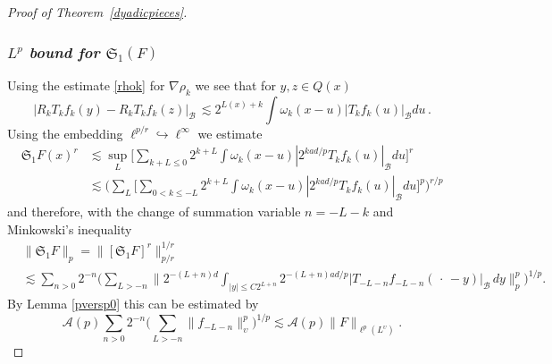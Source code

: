 \documentclass[11pt]{amsart}
\theoremstyle{definition}
\numberwithin{theorem}{section}
\numberwithin{definition}{section}
\renewcommand{\wp}{\upsilon}
\newcommand{\note}[1]{\footnote{\texttt{\Small #1}}}
\def\sB{{\mathscr{B}}}
\def\lc{\lesssim}
\def\om{\omega}              \def\Om{\Omega}
\def\fS{{\mathfrak {S}}}
\def\cA{{\mathcal {A}}}
\begin{document}
\begin{proof}[Proof of Theorem~\ref{dyadicpieces}]
\subsubsection*{{\it $L^p$ bound for $\fS_1(F)$}}
Using the estimate \eqref{rhok} for   $\nabla \rho_k$ we see that
for $y,z\in Q(x)$
$$| R_kT_kf_k(y)-R_kT_kf_k(z)|_\sB \, \lc 2^{L(x)+k}
\int\om_k(x-u)
|T_kf_k(u)|_\sB du\,.
$$
Using the embedding $\ell^{p/r}\hookrightarrow \ell^\infty$ we estimate
\begin{align*}
\fS_1F(x)^r&\lc \sup_L \Big[ \sum_{k+L\le 0} 2^{k+L}
\int\om_k(x-u)  |2^{kad/p} T_kf_k(u)|_\sB du
\Big]^r
\\
&\lc \Big(\sum_L \Big[ \sum_{0<k\le -L} 2^{k+L}
\int\om_k(x-u) |2^{kad/p} T_kf_k(u)|_\sB du
\Big]^p\Big)^{r/p}
\end{align*} and
therefore, with the change of summation variable $n=-L-k$ and Minkowski's inequality
\begin{align*}
&\|\fS_1F\|_p= \big\|[\fS_1 F ]^r\big\|_{p/r}^{1/r}
\\&\lc
\sum_{n>0} 2^{-n}
\Big(\sum_{L> -n}
\Big\| {2^{-(L+n)d}}\int_{|y|\le C 2^{L+n}}
2^{-(L+n)ad/p} |T_{-L-n} f_{-L-n}(\,\cdot\,-y)|_\sB \, dy\Big\|_p^p \Big)^{1/p}.
\end{align*}
By Lemma
\ref{pversp0}
this can be estimated  by
$$\cA(p) \sum_{n>0} 2^{-n} \Big(\sum_{L>-n}\|f_{-L-n}\|_\wp^p\Big)^{1/p} \lc \cA(p)\|F\|_{\ell^p(L^\wp)}.
$$


\end{proof}
\end{document}
